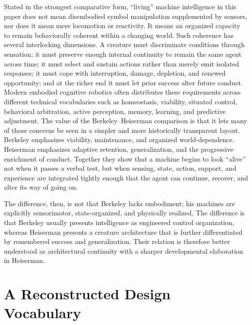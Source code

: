 \documentclass[11pt]{article}
\begin{document}
Stated in the strongest comparative form, ``living'' machine intelligence in this paper does not mean disembodied symbol manipulation supplemented by sensors, nor does it mean mere locomotion or reactivity. It means an organized capacity to remain behaviorally coherent within a changing world. Such coherence has several interlocking dimensions. A creature must discriminate conditions through sensation; it must preserve enough internal continuity to remain the same agent across time; it must select and sustain actions rather than merely emit isolated responses; it must cope with interruption, damage, depletion, and renewed opportunity; and at the richer end it must let prior success alter future conduct. Modern embodied cognitive robotics often distributes these requirements across different technical vocabularies such as homeostasis, viability, situated control, behavioral arbitration, active perception, memory, learning, and predictive adjustment. The value of the Berkeley--Heiserman comparison is that it lets many of those concerns be seen in a simpler and more historically transparent layout. Berkeley emphasizes viability, maintenance, and organized world-dependence. Heiserman emphasizes adaptive retention, generalization, and the progressive enrichment of conduct. Together they show that a machine begins to look ``alive'' not when it passes a verbal test, but when sensing, state, action, support, and experience are integrated tightly enough that the agent can continue, recover, and alter its way of going on.

The difference, then, is not that Berkeley lacks embodiment; his machines are explicitly sensorimotor, state-organized, and physically realized. The difference is that Berkeley usually presents intelligence as engineered control organization, whereas Heiserman presents a creature architecture that is further differentiated by remembered success and generalization. Their relation is therefore better understood as architectural continuity with a sharper developmental elaboration in Heiserman.

\section{A Reconstructed Design Vocabulary}
\end{document}
